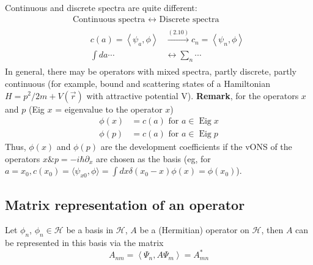 Continuous and discrete spectra are quite different:
\begin{equation}
\begin{array}{l}{\text { Continuous spectra } \longleftrightarrow \text { Discrete spectra }} \\ {\qquad \begin{aligned} c(a)=\left\langle\psi_{a}, \phi\right\rangle & \stackrel{(2.10)}{\longrightarrow} c_{n}=\left\langle\psi_{n}, \phi\right\rangle \\ \int d a \cdots & \longleftrightarrow \sum_{n} \cdots \end{aligned}}\end{array}
\end{equation}
In general, there may be operators with mixed spectra, partly discrete, partly continuous (for example, bound and scattering states of a Hamiltonian $H=p^2/2m+V(\vec{r})$ with attractive potential V).
\textbf{Remark}, for the operators $x$ and $p$ (Eig $x$ = eigenvalue to the operator $x$)
\begin{equation}
\begin{aligned} \phi(x) &=c(a) \text { for } a \in \operatorname{Eig} x \\ \phi(p) &=c(a) \text { for } a \in \operatorname{Eig} p \end{aligned}
\end{equation}
Thus, $\phi(x)$ and $\phi(p)$ are the development coefficients if the vONS of the operators $x\&p=-i\hbar\partial_x$ are chosen as the basis (eg, for $a=x_0,c(x_0)=\langle\psi_{x0},\phi\rangle=\int dx\delta(x_0-x)\phi(x)=\phi(x_0)$).
\subsection{Matrix representation of an operator}
Let {$\phi_n$}, $\phi_n\in\mathcal{H}$ be a basis in $\mathcal{H}$, $A$ be a (Hermitian) operator on $\mathcal{H}$, then $A$ can be represented in this basis via the matrix
\begin{equation}
    A_{n m}=\left\langle\Psi_{n}, A \Psi_{m}\right\rangle= A_{m n}^{*}
    \end{equation}
